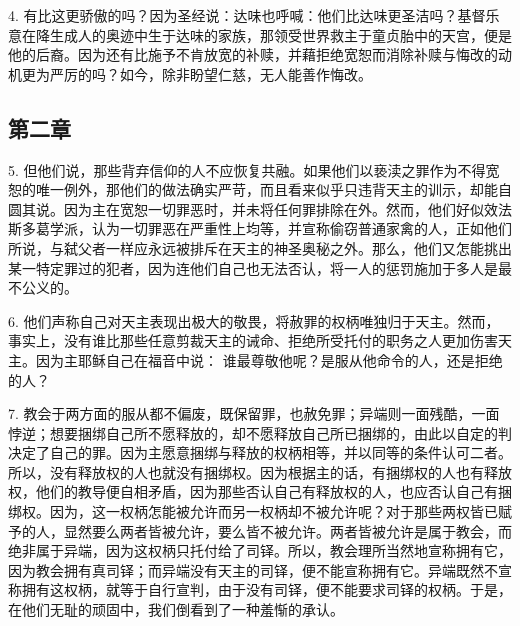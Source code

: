 4. 有比这更骄傲的吗？因为圣经说：达味也呼喊：他们比达味更圣洁吗？基督乐意在降生成人的奥迹中生于达味的家族，那领受世界救主于童贞胎中的天宫，便是他的后裔。因为还有比施予不肯放宽的补赎，并藉拒绝宽恕而消除补赎与悔改的动机更为严厉的吗？如今，除非盼望仁慈，无人能善作悔改。\par


\subsection{第二章}

\par

5. 但他们说，那些背弃信仰的人不应恢复共融。如果他们以亵渎之罪作为不得宽恕的唯一例外，那他们的做法确实严苛，而且看来似乎只违背天主的训示，却能自圆其说。因为主在宽恕一切罪恶时，并未将任何罪排除在外。然而，他们好似效法斯多葛学派，认为一切罪恶在严重性上均等，并宣称偷窃普通家禽的人，正如他们所说，与弑父者一样应永远被排斥在天主的神圣奥秘之外。那么，他们又怎能挑出某一特定罪过的犯者，因为连他们自己也无法否认，将一人的惩罚施加于多人是最不公义的。\par

6. 他们声称自己对天主表现出极大的敬畏，将赦罪的权柄唯独归于天主。然而，事实上，没有谁比那些任意剪裁天主的诫命、拒绝所受托付的职务之人更加伤害天主。因为主耶稣自己在福音中说： 谁最尊敬他呢？是服从他命令的人，还是拒绝的人？\par

7. 教会于两方面的服从都不偏废，既保留罪，也赦免罪；异端则一面残酷，一面悖逆；想要捆绑自己所不愿释放的，却不愿释放自己所已捆绑的，由此以自定的判决定了自己的罪。因为主愿意捆绑与释放的权柄相等，并以同等的条件认可二者。所以，没有释放权的人也就没有捆绑权。因为根据主的话，有捆绑权的人也有释放权，他们的教导便自相矛盾，因为那些否认自己有释放权的人，也应否认自己有捆绑权。因为，这一权柄怎能被允许而另一权柄却不被允许呢？对于那些两权皆已赋予的人，显然要么两者皆被允许，要么皆不被允许。两者皆被允许是属于教会，而绝非属于异端，因为这权柄只托付给了司铎。所以，教会理所当然地宣称拥有它，因为教会拥有真司铎；而异端没有天主的司铎，便不能宣称拥有它。异端既然不宣称拥有这权柄，就等于自行宣判，由于没有司铎，便不能要求司铎的权柄。于是，在他们无耻的顽固中，我们倒看到了一种羞惭的承认。\par

